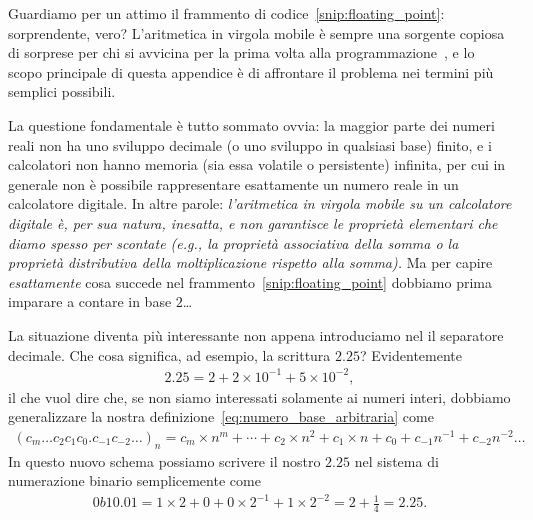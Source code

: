 Guardiamo per un attimo il frammento di codice~\ref{snip:floating_point}:
sorprendente, vero? L'aritmetica in virgola mobile è sempre una sorgente copiosa di
sorprese per chi si avvicina per la prima volta alla
programmazione~\cite{python_floating_point, bush_floating_point}, e lo scopo
principale di questa appendice è di affrontare il problema nei termini più
semplici possibili.


La questione fondamentale è tutto sommato ovvia: la maggior parte dei numeri
reali non ha uno sviluppo decimale (o uno sviluppo in qualsiasi base) finito,
e i calcolatori non hanno memoria (sia essa volatile o persistente) infinita,
per cui in generale non è possibile rappresentare esattamente un numero reale
in un calcolatore digitale. In altre parole:
\emph{l'aritmetica in virgola mobile su un calcolatore digitale è, per sua
natura, inesatta, e non garantisce le proprietà elementari che diamo spesso
per scontate (e.g., la proprietà associativa della somma o la proprietà
distributiva della moltiplicazione rispetto alla somma).}
Ma per capire \emph{esattamente} cosa succede nel frammento~\ref{snip:floating_point}
dobbiamo prima imparare a contare in base $2$\ldots

La situazione diventa più interessante non appena introduciamo nel 
il separatore decimale. Che cosa significa, ad esempio, la scrittura $2.25$?
Evidentemente
\begin{align*}
  2.25 = 2 + 2 \times 10^{-1} + 5 \times 10^{-2},
\end{align*}
il che vuol dire che, se non siamo interessati solamente ai numeri interi,
dobbiamo generalizzare la nostra definizione~\eqref{eq:numero_base_arbitraria}
come
\begin{align}
  (c_m\ldots c_2c_1c_0.c_{-1}c_{-2}\ldots)_n =
  c_m \times n^m + \cdots + c_2 \times n^2 +  c_1 \times n + c_0 +
  c_{-1} n^{-1} +   c_{-2} n^{-2} \ldots
\end{align}
In questo nuovo schema possiamo scrivere il nostro $2.25$ nel sistema di
numerazione binario semplicemente come
\begin{align*}
  0b10.01 = 1 \times 2 + 0 + 0 \times 2^{-1} + 1 \times 2^{-2} =
  2 + \frac{1}{4} = 2.25.
\end{align*}

